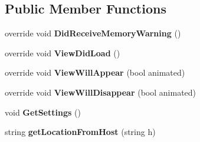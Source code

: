 \subsection*{Public Member Functions}
\begin{DoxyCompactItemize}
\item 
\hypertarget{class_pro_scan_mobile_1_1vc_options_screen_a1aec538a8819aa5a3fb4b693d1548e2b}{override void {\bfseries Did\-Receive\-Memory\-Warning} ()}\label{class_pro_scan_mobile_1_1vc_options_screen_a1aec538a8819aa5a3fb4b693d1548e2b}

\item 
\hypertarget{class_pro_scan_mobile_1_1vc_options_screen_ace215be4820d6d403de4416f7e48ad77}{override void {\bfseries View\-Did\-Load} ()}\label{class_pro_scan_mobile_1_1vc_options_screen_ace215be4820d6d403de4416f7e48ad77}

\item 
\hypertarget{class_pro_scan_mobile_1_1vc_options_screen_a8aaddb5de0552580e88a1cdc2a2d080e}{override void {\bfseries View\-Will\-Appear} (bool animated)}\label{class_pro_scan_mobile_1_1vc_options_screen_a8aaddb5de0552580e88a1cdc2a2d080e}

\item 
\hypertarget{class_pro_scan_mobile_1_1vc_options_screen_a3ea1b73c4cb2c1e01ea8382a6bc27d01}{override void {\bfseries View\-Will\-Disappear} (bool animated)}\label{class_pro_scan_mobile_1_1vc_options_screen_a3ea1b73c4cb2c1e01ea8382a6bc27d01}

\item 
\hypertarget{class_pro_scan_mobile_1_1vc_options_screen_ae4ff185d2fba96c3297f4e995434044b}{void {\bfseries Get\-Settings} ()}\label{class_pro_scan_mobile_1_1vc_options_screen_ae4ff185d2fba96c3297f4e995434044b}

\item 
\hypertarget{class_pro_scan_mobile_1_1vc_options_screen_a95b59489acb4d95e6aad4555254303cd}{string {\bfseries get\-Location\-From\-Host} (string h)}\label{class_pro_scan_mobile_1_1vc_options_screen_a95b59489acb4d95e6aad4555254303cd}

\end{DoxyCompactItemize}
